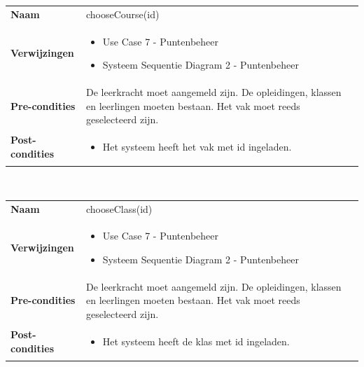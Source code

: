 \documentclass[a4paper]{article}
\begin{document}
\begin{tabularx}{\textwidth}{|l X|}
    \hline
    \textbf{Naam} & chooseCourse(id) \\
    \textbf{Verwijzingen} & \begin{itemize}[leftmargin=*]
        \item Use Case 7 - Puntenbeheer
        \item Systeem Sequentie Diagram 2 - Puntenbeheer
    \end{itemize}\\
    \textbf{Pre-condities} & De leerkracht moet aangemeld zijn. De opleidingen, klassen en leerlingen moeten bestaan. Het vak moet reeds geselecteerd zijn.\\
    \textbf{Post-condities} & \begin{itemize}[leftmargin=*]
        \item Het systeem heeft het vak met id ingeladen.
    \end{itemize}\\
    \hline
\end{tabularx}\\

\begin{tabularx}{\textwidth}{|l X|}
    \hline
    \textbf{Naam} & chooseClass(id) \\
    \textbf{Verwijzingen} & \begin{itemize}[leftmargin=*]
        \item Use Case 7 - Puntenbeheer
        \item Systeem Sequentie Diagram 2 - Puntenbeheer
    \end{itemize}\\
    \textbf{Pre-condities} & De leerkracht moet aangemeld zijn. De opleidingen, klassen en leerlingen moeten bestaan. Het vak moet reeds geselecteerd zijn.\\
    \textbf{Post-condities} & \begin{itemize}[leftmargin=*]
        \item Het systeem heeft de klas met id ingeladen.
    \end{itemize}\\
    \hline
\end{tabularx}\\
\end{document}
